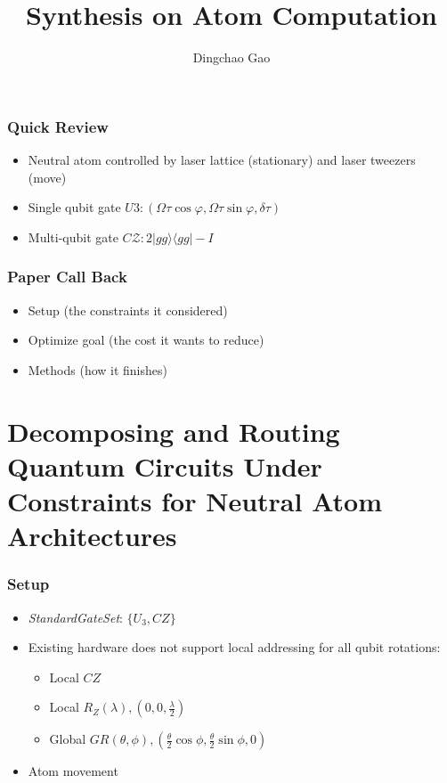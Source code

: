 \documentclass[18 pt]{beamer}
\title{Synthesis on Atom Computation}
\author[Gcc]{Dingchao Gao}
\institute[ISCAS]{Institute of Software Chinese Academy of Sciences}
\begin{document}
\begin{frame}[plain]
    \titlepage
  \end{frame}

\begin{frame}
    \frametitle{Quick Review}
    \begin{itemize}
        \item Neutral atom controlled by laser lattice (stationary) and laser tweezers (move)
        \item Single qubit gate $U3: (\Omega\tau\cos{\varphi},\Omega\tau\sin{\varphi},\delta\tau)$
        \item Multi-qubit gate $C\mathcal{Z}: 2|gg\rangle\langle gg| - I$
    \end{itemize}
\end{frame}

\begin{frame}
    \frametitle{Paper Call Back}
    \begin{itemize}
        \item Setup (the constraints it considered)
        \item Optimize goal (the cost it wants to reduce)
        \item Methods (how it finishes)
    \end{itemize}
\end{frame}
\section{Decomposing and Routing Quantum Circuits Under Constraints for Neutral Atom Architectures}

\begin{frame}
    \frametitle{Setup}
    \begin{itemize}
        \item \textit{StandardGateSet}: $\{U_3,CZ\}$
        \item Existing hardware does not support local addressing for all qubit rotations:
        \begin{itemize}
            \item Local $CZ$
            \item Local $R_Z(\lambda), (0,0,\frac{\lambda}{2})$
            \item Global $GR(\theta,\phi), (\frac{\theta}{2}\cos{\phi},\frac{\theta}{2}\sin{\phi},0)$
        \end{itemize}
        \item Atom movement
    \end{itemize}
\end{frame}
\end{document}
